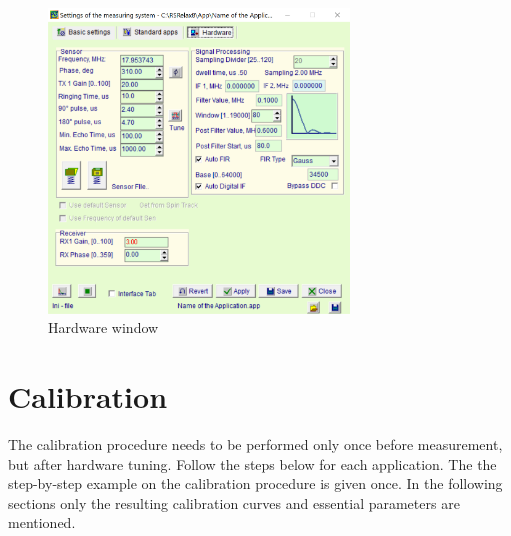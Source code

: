 \documentclass[a4paper,12pt]{article}
\begin{document}
\begin{enumerate}
\begin{figure}[!ht]
\centering
\includegraphics[width=8cm]{Settings_Hardware.png}
\caption{Hardware window}
\label{fig:Hardware window}
\end{figure}
\end{enumerate}

\newpage
\section{Calibration}
\label{sec:Calibration}

The calibration procedure needs to be performed only once before measurement, but after hardware tuning. 
Follow the steps below for each application.
The the step-by-step example on the calibration procedure is given once.
In the following sections only the resulting calibration curves and essential parameters are mentioned.
\end{document}
